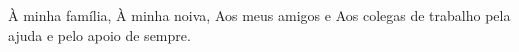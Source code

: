 \begin{agradecimentos}
À minha família,
À minha noiva,
Aos meus amigos e 
Aos colegas de trabalho pela ajuda e pelo apoio de sempre.
\end{agradecimentos}
